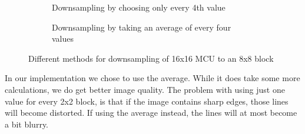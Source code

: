 \begin{figure}
    \centering
    \begin{subfigure}[b]{0.3\textwidth}
        \caption{Downsampling by choosing only every 4th value}
        \label{fig:downsampling4th}
    \end{subfigure}
    \qquad %
    \begin{subfigure}[b]{0.3\textwidth}
        \caption{Downsampling by taking an average of every four values}
        \label{fig:downsamplingAverage}
    \end{subfigure}
    \caption{Different methods for downsampling of 16x16 MCU to an 8x8 block}\label{fig:downsampling}
\end{figure}


In our implementation we chose to use the average.
While it does take some more calculations, we do get better image quality.
The problem with using just one value for every 2x2 block, is that if the image contains sharp edges, those lines will become distorted.
If using the average instead, the lines will at most become a bit blurry.

